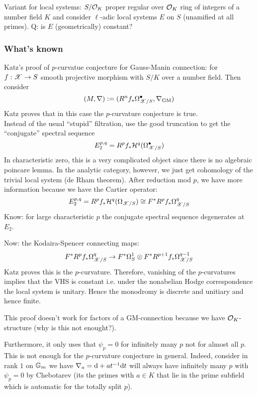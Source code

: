 \documentclass[12pt]{article}
\begin{document}
Variant for local systems: $S/ \mathcal{O}_{K}$ proper regular over $\mathcal{O}_{K}$ ring of integers of a number field $K$ and consider $\ell$-adic local systems $E$ on $S$ (unamified at all primes). Q: is $E$ (geometrically) constant? 

\subsubsection{What's known}

Katz's proof of $p$-curvatue conjecture for Gauss-Manin connection: for $f : \mathscr{X} \to S$ smooth projective morphism with $S / K$ over a number field. Then consider
\[ (M, \nabla) := (R^n f_* \Omega_{\mathscr{X}/S}^\bullet, \nabla_{\mathrm{GM}}) \]
Katz proves that in this case the $p$-curvature conjecture is true. 
\\
Instead of the usual ``stupid'' filtration, use the good truncation to get the ``conjugate'' spectral sequence
\[ E^{p,q}_2 = R^p f_* \mathcal{H}^q(\Omega^\bullet_{\mathscr{X}/S}) \]
In characteristic zero, this is a very complicated object since there is no algebraic poincare lemma. In the analytic category, however, we just get cohomology of the trivial local system (de Rham theorem). After reduction mod $p$, we have more information because we have the Cartier operator:
\[ E^{p,q}_2 = R^p f_* \mathcal{H}^q(\Omega_{\mathscr{X}/S}) \cong F^* R^p f_* \Omega_{\mathscr{X}/S}^q \]
Know: for large characteristic $p$ the conjugate spectral sequence degenerates at $E_2$.

Now: the Kodaira-Spencer connecting maps:
\[ F^* R^p f_* \Omega^q_{\mathscr{X}/S} \to F^* \Omega_S^1 \otimes F^* R^{p+1} f_* \Omega_{\mathscr{X}/S}^{q-1} \] 
Katz proves this is the $p$-curvature. Therefore, vanishing of the $p$-curvatures implies that the VHS is constant i.e. under the nonabelian Hodge correspondence the local system is unitary. Hence the monodromy is discrete and unitiary and hence finite. 

\begin{rmk}
This proof doesn't work for factors of a GM-connection because we have $\mathcal{O}_{K}$-structure (why is this not enought?).

Furthermore, it only uses that $\psi_p = 0$ for infinitely many $p$ not for almost all $p$. This is not enough for the $p$-curvature conjecture in general. Indeed, consider in rank $1$ on $\mathbb{G}_m$ we have $\nabla_a = \mathrm{d} + a t^{-1} \mathrm{d}{t}$ will always have infinitely many $p$ with $\psi_p = 0$ by Chebotarev (its the primes with $a \in K$ that lie in the prime subfield which is automatic for the totally split $p$). 
\end{rmk}
\end{document}
